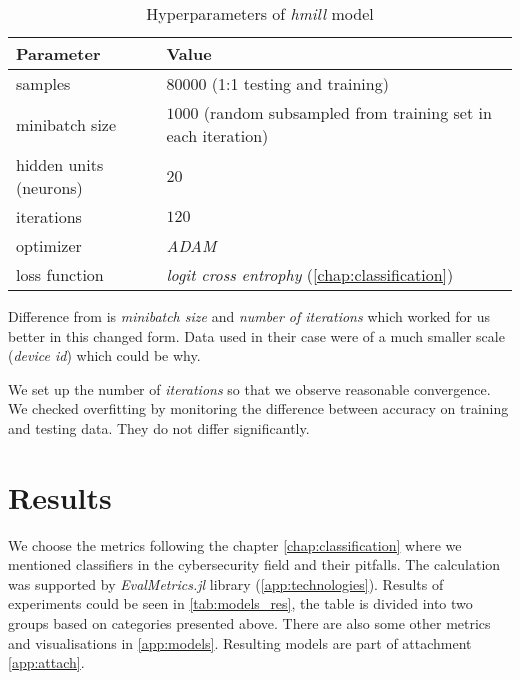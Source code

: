 \begin{table}[h]
  \centering
  \caption{Hyperparameters of \emph{hmill} model}
  \begin{tabular}{p{6cm}p{8cm}} 
      \toprule
      \textbf{Parameter} &
      \textbf{Value} \\
      \midrule
      samples & $80000$ (1:1 testing and training) \\
      \midrule
      minibatch size & $1000$ (random subsampled from training set in each iteration)\\
      \midrule
      hidden units (neurons)& $20$\\
      \midrule
      iterations & $120$\\
      \midrule
      optimizer & \emph{ADAM} \cite{Kingma2014}\\
      \midrule
      loss function & \emph{logit cross entrophy} (\ref{chap:classification})\\
      \bottomrule
  \end{tabular}
  \label{tab:hyperparams}
\end{table}


Difference from \cite{Mandlik2020} is \emph{minibatch size} and \emph{number of iterations} which worked for us better in this changed form. Data used in their case were of a much smaller scale (\emph{device id}) which could be why.

We set up the number of \emph{iterations}  so that we observe reasonable convergence. We checked overfitting by monitoring the difference between accuracy on training and testing data. They do not differ significantly.

\section{Results}
We choose the metrics following the chapter \ref{chap:classification} where we mentioned classifiers in the cybersecurity field and their pitfalls. The calculation was supported by \emph{EvalMetrics.jl} library (\ref{app:technologies}). Results of experiments could be seen in \ref{tab:models_res}, the table is divided into two groups based on categories presented above. There are also some other metrics and visualisations in \ref{app:models}. Resulting models are part of attachment \ref{app:attach}.


